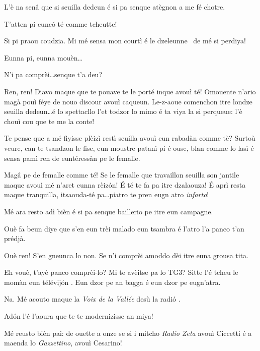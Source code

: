 \begin{drama}

\Gerominespeaks {} L’è na senâ que si seuilla dedeun é si pa senque atègnon a me fé chotre.

\Casimirspeaks T’atten pi eunc\'o té comme tcheutte!

\Gerominespeaks Si pi praou coudzia. Mi mé sensa mon courtì é le dzeleunne \gallina\ de mé si perdiya!

\Casimirspeaks {} Eunna pi, eunna mouèn\ldots

\Gerominespeaks N’i pa comprèi\ldots senque t’a deu?

\Casimirspeaks Ren, ren! Diavo maque que te pouave te le porté inque avouì té! O\-mou\-en\-te n’ario magà pouì féye de nouo discour avouì caqueun. Le-z-aoue comenchon itre londze seuilla dedeun\ldots é lo spettacllo l’et todzor lo mimo  é ta viya la si perqueue: l’è chouì cou que te me la conte!

\Gerominespeaks Te pense que a mé fiyisse plèizì restì seuilla avouì eun rabadàn comme tè? Surtoù veure, can te tsandzon le fise, eun mous\-tre patanì pi é ouse, blan comme lo lasì é sensa pamì ren de euntéressàn pe le femalle.

\Casimirspeaks Mag\^a pe de femalle comme té! Se le femalle que travaillon seuilla son jantile maque avouì mé n’aret eunna rèizón! \'E té te fa pa itre dzalaouza! \'E aprì resta maque tranquilla, itsaouda-té pa\ldots piatro te pren eugn atro \textit{infarto}!

\Gerominespeaks Mé ara resto adì bièn é si pa senque baillerio pe itre eun campagne.

\Casimirspeaks Ouè fa beun diye que s’en eun trèi malado eun tsambra é l’atro  l’a panco t’an prédjà.

\Gerominespeaks Ouè ren! S’en gneunca lo non. Se n'i comprèi a\-mod\-do dèi itre euna grousa tita.

\Casimirspeaks Eh vouè, t’ayè panco comprèi-lo? Mi te avèitse pa lo TG3? Sitte l'é tcheu le momàn eun télévij\'on \tv . Eun dzor pe an bagga é eun dzor pe eugn'atra.

\Gerominespeaks Na. Mé acouto maque la \textit{Voix de la Vallée} desù la radi\'o \radio .

\Casimirspeaks Ad\'on l’é l’aoura que te te modernizisse an miya!

\Gerominespeaks Mé reusto bièn pai: de ouette a onze se si i mitcho \textit{Radio Zeta} avouì Ciccetti é a maenda lo \textit{Gazzettino}, avouì Cesarino!


\end{drama}
